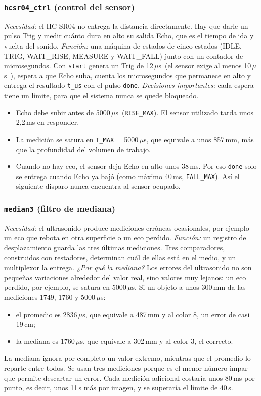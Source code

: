 \documentclass[conference]{IEEEtran}
\newcommand{\mo}[1]{\texttt{#1}}
\newcommand{\us}{\,$\mu$s}
\begin{document}
\subsubsection{\mo{hcsr04\_ctrl} (control del sensor)}
\emph{Necesidad:} el HC-SR04 no entrega la distancia directamente. Hay que darle un pulso Trig y medir cuánto dura en alto su salida Echo, que es el tiempo de ida y vuelta del sonido.
\emph{Función:} una máquina de estados de cinco estados (IDLE, TRIG, WAIT\_RISE, MEASURE y WAIT\_FALL) junto con un contador de microsegundos. Con \mo{start} genera un Trig de 12\us\ (el sensor exige al menos 10\us~\cite{hcsr04}), espera a que Echo suba, cuenta los microsegundos que permanece en alto y entrega el resultado \mo{t\_us} con el pulso \mo{done}.
\emph{Decisiones importantes:} cada espera tiene un límite, para que el sistema nunca se quede bloqueado.
\begin{itemize}
\item Echo debe subir antes de 5000\us\ (\mo{RISE\_MAX}). El sensor utilizado tarda unos 2,2\,ms en responder.
\item La medición se satura en \mo{T\_MAX} = 5000\us, que equivale a unos 857\,mm, más que la profundidad del volumen de trabajo.
\item Cuando no hay eco, el sensor deja Echo en alto unos 38\,ms. Por eso \mo{done} solo se entrega cuando Echo ya bajó (como máximo 40\,ms, \mo{FALL\_MAX}). Así el siguiente disparo nunca encuentra al sensor ocupado.
\end{itemize}

\subsubsection{\mo{median3} (filtro de mediana)}
\emph{Necesidad:} el ultrasonido produce mediciones erróneas ocasionales, por ejemplo un eco que rebota en otra superficie o un eco perdido.
\emph{Función:} un registro de desplazamiento guarda las tres últimas mediciones. Tres comparadores, construidos con restadores, determinan cuál de ellas está en el medio, y un multiplexor la entrega.
\emph{¿Por qué la mediana?} Los errores del ultrasonido no son pequeñas variaciones alrededor del valor real, sino valores muy lejanos: un eco perdido, por ejemplo, se satura en 5000\us. Si un objeto a unos 300\,mm da las mediciones 1749, 1760 y 5000\us:
\begin{itemize}
\item el promedio es 2836\us, que equivale a 487\,mm y al color 8, un error de casi 19\,cm;
\item la mediana es 1760\us, que equivale a 302\,mm y al color 3, el correcto.
\end{itemize}
La mediana ignora por completo un valor extremo, mientras que el promedio lo reparte entre todos. Se usan tres mediciones porque es el menor número impar que permite descartar un error. Cada medición adicional costaría unos 80\,ms por punto, es decir, unos 11\,s más por imagen, y se superaría el límite de 40\,s.
\end{document}
